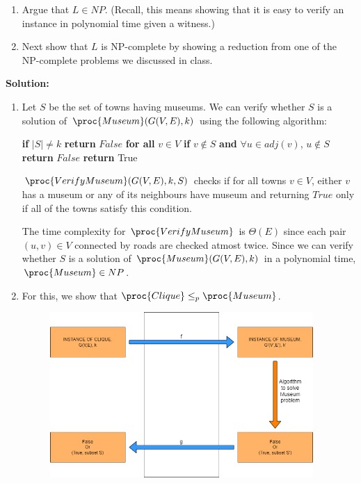 \documentclass[11pt]{article}
\begin{document}
\begin{enumerate}
    \item Argue that $L \in NP$. (Recall, this means showing that it is easy to verify an instance in polynomial time given a witness.)

    \item Next show that $L$ is NP-complete by showing a reduction from one of the NP-complete problems we discussed in class.
    
\end{enumerate}
\noindent\textbf{Solution:}
\begin{enumerate}
    \item Let $S$ be the set of towns having museums. We can verify whether $S$ is a solution of $\proc{Museum}(G(V, E),k)$ using the following algorithm:
    \begin{codebox}
        \li \textbf{if} $|S| \neq k$
        \li \quad \textbf{return} $False$
        \li \textbf{for all} $v \in V$
        \li \quad \textbf{if} $v \notin S$ \textbf{and} $\forall u \in adj(v)$, $u \notin S$
        \li \quad \quad \textbf{return} $False$
        \li \textbf{return} True
        \end{codebox}
    
    $\proc{VerifyMuseum}(G(V, E),k,S)$ checks if for all towns $v \in V$, either $v$ has a museum or any of its neighbours have museum and returning $True$ only if all of the towns satisfy this condition.
    
    The time complexity for $\proc{VerifyMuseum}$ is $\Theta(E)$ since each pair $(u,v) \in V$ connected by roads are checked atmost twice. Since we can verify whether $S$ is a solution of $\proc{Museum}(G(V, E),k)$ in a polynomial time, $\proc{Museum} \in NP$.
    \newpage
    \item For this, we show that $\proc{Clique} \leq_{p} \proc{Museum}$.
        
    \begin{figure}[h]
    \centering
        \includegraphics[width=100mm]{Q3.png}
    \end{figure}
    

\end{enumerate}
\end{document}
